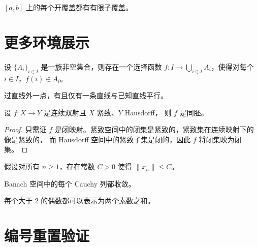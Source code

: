 \documentclass[12pt,a4paper]{ctexart}
\begin{document}
\begin{corollary}[有限覆盖]
$[a,b]$ 上的每个开覆盖都有有限子覆盖。
\end{corollary}

\section{更多环境展示}

\begin{axiom}
设 $\{A_i\}_{i\in I}$ 是一族非空集合，则存在一个选择函数
$f\colon I\to\bigcup_{i\in I}A_i$，使得对每个 $i\in I$，$f(i)\in A_i$。
\end{axiom}

\begin{postulate}[欧几里得第五公设]
过直线外一点，有且仅有一条直线与已知直线平行。
\end{postulate}

\begin{proposition}[开映射性质]
设 $f\colon X\to Y$ 是连续双射且 $X$ 紧致、$Y$ Hausdorff，
则 $f$ 是同胚。
\end{proposition}

\begin{proof}
只需证 $f$ 是闭映射。紧致空间中的闭集是紧致的，紧致集在连续映射下的像是紧致的，
而 Hausdorff 空间中的紧致子集是闭的，因此 $f$ 将闭集映为闭集。
\end{proof}

\begin{assumption}[有界性假设]
假设对所有 $n\geq1$，存在常数 $C>0$ 使得 $\|x_n\|\leq C$。
\end{assumption}

\begin{property}
Banach 空间中的每个 Cauchy 列都收敛。
\end{property}

\begin{conjecture}[Goldbach 猜想]
每个大于 $2$ 的偶数都可以表示为两个素数之和。
\end{conjecture}

\section{编号重置验证}
\end{document}
